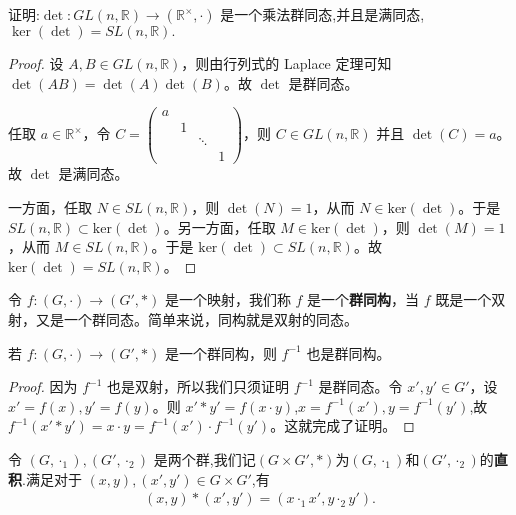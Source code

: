 \documentclass[../../main.tex]{subfiles}
\begin{document}
\begin{example}\label{example:行列是就是一个乘法群同态}
证明:$\det : GL(n, \mathbb{R}) \to (\mathbb{R}^\times, \cdot)$ 是一个乘法群同态,并且是满同态,$\ker (\det)=SL(n, \mathbb{R}).$
\end{example}
\begin{proof}
设 \(A, B \in GL(n, \mathbb{R})\)，则由行列式的 Laplace 定理可知 \(\det(AB) = \det(A)\det(B)\)。故 \(\det\) 是群同态。

任取 \(a \in \mathbb{R}^{\times}\)，令 \(C = \begin{pmatrix}
a & & & \\
& 1 & & \\
& & \ddots & \\
& & & 1
\end{pmatrix}\)，则 \(C \in GL(n, \mathbb{R})\) 并且 \(\det(C) = a\)。故 \(\det\) 是满同态。

一方面，任取 \(N \in SL(n, \mathbb{R})\)，则 \(\det(N) = 1\)，从而 \(N \in \mathrm{ker}(\det)\)。于是 \(SL(n, \mathbb{R}) \subset \mathrm{ker}(\det)\)。另一方面，任取 \(M \in \mathrm{ker}(\det)\)，则 \(\det(M) = 1\)，从而 \(M \in SL(n, \mathbb{R})\)。于是 \(\mathrm{ker}(\det) \subset SL(n, \mathbb{R})\)。故 \(\mathrm{ker}(\det) = SL(n, \mathbb{R})\)。 
\end{proof}

\begin{definition}[群同构]
令 $f:(G,\cdot)\to (G',*)$ 是一个映射，我们称 $f$ 是一个\textbf{群同构}，当 $f$ 既是一个双射，又是一个群同态。简单来说，同构就是双射的同态。
\end{definition}

\begin{proposition}[群同构的逆也是群同构]
若 $f:(G,\cdot)\to (G',*)$ 是一个群同构，则 $f^{-1}$ 也是群同构。
\end{proposition}
\begin{proof}
因为 $f^{-1}$ 也是双射，所以我们只须证明 $f^{-1}$ 是群同态。令 $x',y'\in G'$，设 $x' = f(x),y' = f(y)$。则 $x'*y' = f(x\cdot y)$,$x=f^{-1}(x'),y=f^{-1}(y')$,故 $f^{-1}(x'*y')=x\cdot y = f^{-1}(x')\cdot f^{-1}(y')$。这就完成了证明。 
\end{proof}

\begin{definition}[两个群的直积]
令 $(G,\cdot_1),(G',\cdot_2)$ 是两个群,我们记$(G\times G',*)$为$(G,\cdot_1)$和$(G',\cdot_2)$的\textbf{直积}.满足对于 $(x,y),(x',y')\in G\times G'$,有
\begin{align*}
(x,y)*(x',y')=(x\cdot_1 x',y\cdot_2 y').
\end{align*}
\end{definition}
\end{document}
